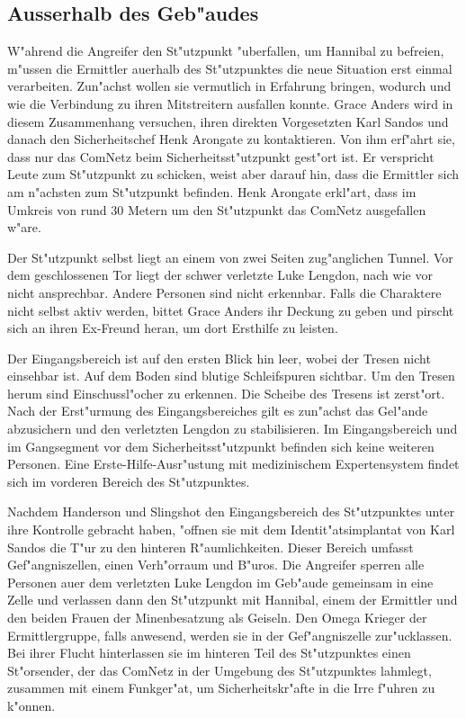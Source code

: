 \subsection[Au\3erhalb des Geb"audes]{Ausserhalb des Geb"audes}
W"ahrend die Angreifer den St"utzpunkt "uberfallen, um Hannibal zu befreien, m"ussen die Ermittler au\3erhalb des St"utzpunktes die neue Situation erst einmal verarbeiten. Zun"achst wollen sie vermutlich in Erfahrung bringen, wodurch und wie die Verbindung zu ihren Mitstreitern ausfallen konnte. Grace Anders wird in diesem Zusammenhang versuchen, ihren direkten Vorgesetzten Karl Sandos und danach den Sicherheitschef Henk Arongate zu kontaktieren. Von ihm erf"ahrt sie, dass nur das ComNetz beim Sicherheitsst"utzpunkt gest"ort ist. Er verspricht Leute zum St"utzpunkt zu schicken, weist aber darauf hin, dass die Ermittler sich am n"achsten zum St"utzpunkt befinden. Henk Arongate erkl"art, dass im Umkreis von rund 30 Metern um den St"utzpunkt das ComNetz ausgefallen w"are. 

Der St"utzpunkt selbst liegt an einem von zwei Seiten zug"anglichen Tunnel. Vor dem geschlossenen Tor liegt der schwer verletzte Luke Lengdon, nach wie vor nicht ansprechbar. Andere Personen sind nicht erkennbar. Falls die Charaktere nicht selbst aktiv werden, bittet Grace Anders ihr Deckung zu geben und pirscht sich an ihren Ex-Freund heran, um dort Ersthilfe zu leisten.

Der Eingangsbereich ist auf den ersten Blick hin leer, wobei der Tresen nicht einsehbar ist. Auf dem Boden sind blutige Schleifspuren  sichtbar. Um den Tresen herum sind Einschussl"ocher zu erkennen. Die Scheibe des Tresens ist zerst"ort. Nach der Erst"urmung des Eingangsbereiches gilt es zun"achst das Gel"ande abzusichern und den verletzten Lengdon zu stabilisieren. Im Eingangsbereich und im Gangsegment vor dem Sicherheitsst"utzpunkt befinden sich keine weiteren Personen. Eine Erste-Hilfe-Ausr"ustung mit medizinischem Expertensystem findet sich im vorderen Bereich des St"utzpunktes.

Nachdem Handerson und Slingshot den Eingangsbereich des St"utzpunktes unter ihre Kontrolle gebracht haben, "offnen sie mit dem Identit"atsimplantat von Karl Sandos die T"ur zu den hinteren R"aumlichkeiten. Dieser Bereich umfasst Gef"angniszellen, einen Verh"orraum und B"uros. Die Angreifer sperren alle Personen au\3er dem verletzten Luke Lengdon im Geb"aude gemeinsam in eine Zelle und verlassen dann den St"utzpunkt mit Hannibal, einem der Ermittler und den beiden Frauen der Minenbesatzung als Geiseln. Den Omega Krieger der Ermittlergruppe, falls anwesend, werden sie in der Gef"angniszelle zur"ucklassen. Bei ihrer Flucht hinterlassen sie im hinteren Teil des St"utzpunktes einen St"orsender, der das ComNetz in der Umgebung des St"utzpunktes lahmlegt, zusammen mit einem Funkger"at, um Sicherheitskr"afte in die Irre f"uhren zu k"onnen.


